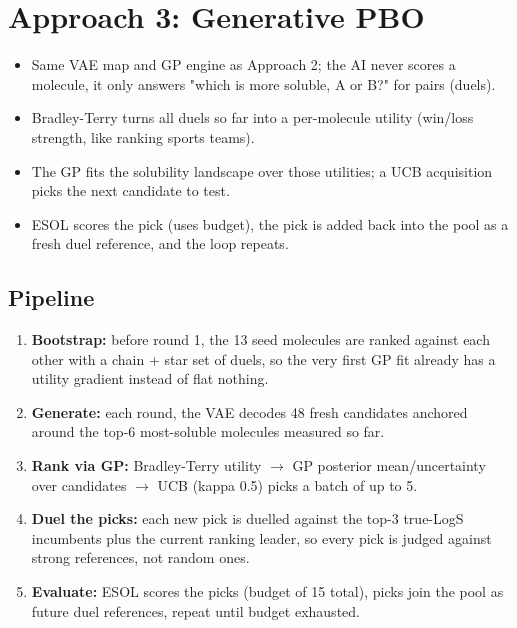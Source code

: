 \documentclass[11pt,a4paper]{article}
\begin{document}
\section{Approach 3: Generative PBO}
\begin{itemize}
    \item Same VAE map and GP engine as Approach 2; the AI never scores a molecule, it only answers "which is more soluble, A or B?" for pairs (duels).
    \item Bradley-Terry turns all duels so far into a per-molecule utility (win/loss strength, like ranking sports teams).
    \item The GP fits the solubility landscape over those utilities; a UCB acquisition picks the next candidate to test.
    \item ESOL scores the pick (uses budget), the pick is added back into the pool as a fresh duel reference, and the loop repeats.
\end{itemize}

\subsection{Pipeline}
\begin{enumerate}
    \item \textbf{Bootstrap:} before round 1, the 13 seed molecules are ranked against each other with a chain + star set of duels, so the very first GP fit already has a utility gradient instead of flat nothing.
    \item \textbf{Generate:} each round, the VAE decodes 48 fresh candidates anchored around the top-6 most-soluble molecules measured so far.
    \item \textbf{Rank via GP:} Bradley-Terry utility $\to$ GP posterior mean/uncertainty over candidates $\to$ UCB (kappa 0.5) picks a batch of up to 5.
    \item \textbf{Duel the picks:} each new pick is duelled against the top-3 true-LogS incumbents plus the current ranking leader, so every pick is judged against strong references, not random ones.
    \item \textbf{Evaluate:} ESOL scores the picks (budget of 15 total), picks join the pool as future duel references, repeat until budget exhausted.
\end{enumerate}
\end{document}
